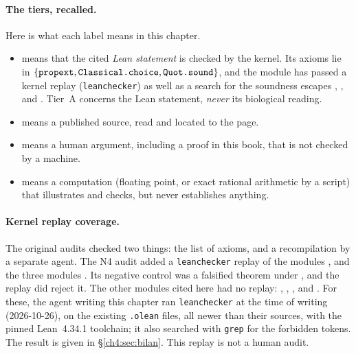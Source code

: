\paragraph{The tiers, recalled.} Here is what each label means in this chapter.
\begin{itemize}[itemsep=1pt]
\item \tierA{} means that the cited \emph{Lean statement} is checked by the kernel. Its axioms lie in
$\{\lean{propext},\lean{Classical.choice},\lean{Quot.sound}\}$, and the module has passed a kernel replay
(\texttt{leanchecker}) as well as a search for the soundness escapes , ,
 and . Tier~A concerns the Lean statement, \emph{never} its
biological reading.
\item \tierL{} means a published source, read and located to the page.
\item \tierC{} means a human argument, including a proof in this book, that is not checked by
a machine.
\item \tierX{} means a computation (floating point, or exact rational arithmetic by a script) that illustrates and
checks, but never establishes anything.
\end{itemize}

\paragraph{Kernel replay coverage.} The original audits checked two things: the list of axioms, and
a recompilation by a separate agent. The N4 audit added a \texttt{leanchecker} replay of the modules
,  and the three modules
. Its negative control was a falsified theorem under ,
and the replay did reject it. The other modules cited here had no replay: ,
, ,
 and . For these, the agent writing this
chapter ran \texttt{leanchecker} at the time of writing (2026-10-26), on the existing \texttt{.olean} files,
all newer than their sources, with the pinned Lean~4.34.1 toolchain; it also searched with \texttt{grep}
for the forbidden tokens. The result is given in §\ref{ch4:sec:bilan}. This replay is not a human audit.

